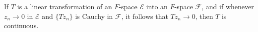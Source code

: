 If $T$ is a linear transformation of an $F$-space $\mathcal{E}$ into an $F$-space $\mathcal{F}$, and if whenever $z_n \to 0$ in $\mathcal{E}$ and $\{Tz_n\}$ is Cauchy in $\mathcal{F}$, it follows that $Tz_n \to 0$, then $T$ is continuous.
